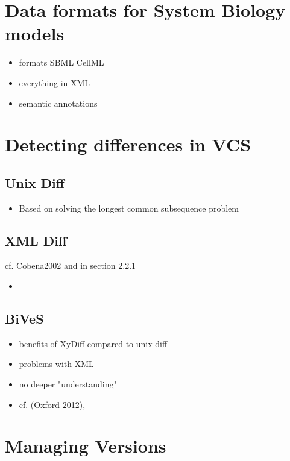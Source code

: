 \section{Data formats for System Biology models}
	\begin{itemize}
		\item formats
		\subitem SBML
		\subitem CellML
		\subitem \sedml
		\item everything in XML
		\item semantic annotations
	\end{itemize}

\section{Detecting differences in VCS}
	\subsection{Unix Diff}
	\begin{itemize}
		\item Based on solving the longest common subsequence problem
	\end{itemize}
	
	\subsection{XML Diff}
	cf. Cobena2002 and \cite{Waltemath2013} in section 2.2.1
	\begin{itemize}
		\item 
	\end{itemize}
	
	\subsection{BiVeS}
	\begin{itemize}
		\item benefits of XyDiff compared to unix-diff
		\item problems with XML
		\item no deeper "understanding"
		\item cf. \cite{Waltemath2013} (Oxford 2012), \cite{Scharm2015}
	\end{itemize}
	
\section{Managing Versions}
